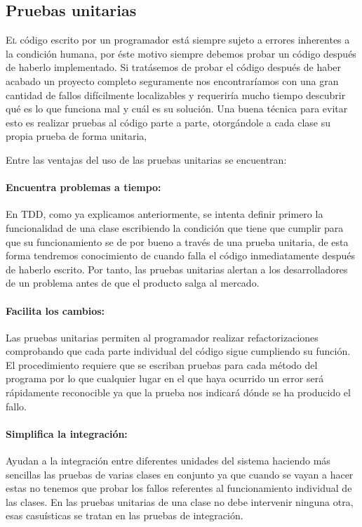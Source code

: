 \documentclass[12pt,a4paper,spanish]{book} %
\begin{document}
\newpage
\subsection{Pruebas unitarias}

\lettrine{E}{l} código escrito por un programador está siempre sujeto a errores inherentes a la condición humana, por éste motivo siempre debemos probar un código después de haberlo implementado. Si tratásemos de probar el código después de haber acabado un proyecto completo seguramente nos encontraríamos con una gran cantidad de fallos difícilmente localizables y requeriría mucho tiempo descubrir qué es lo que funciona mal y cuál es su solución. Una buena técnica para evitar esto es realizar pruebas al código parte a parte, otorgándole a cada clase su propia prueba de forma unitaria,
 
 Entre las ventajas del uso de las pruebas unitarias se encuentran:
 
 \paragraph{Encuentra problemas a tiempo:} En TDD, como ya explicamos anteriormente, se intenta definir primero la funcionalidad de una clase escribiendo la condición que tiene que cumplir para que su funcionamiento se de por bueno a través de una prueba unitaria, de esta forma tendremos conocimiento de cuando falla el código inmediatamente después de haberlo escrito. Por tanto, las pruebas unitarias alertan a los desarrolladores de un problema antes de que el producto salga al mercado.
 \paragraph{Facilita los cambios:} Las pruebas unitarias permiten al programador realizar refactorizaciones comprobando que cada parte individual del código sigue cumpliendo su función. El procedimiento requiere que se escriban pruebas para cada método del programa por lo que cualquier lugar en el que haya ocurrido un error será rápidamente reconocible ya que la prueba nos indicará dónde se ha producido el fallo.
 \paragraph{Simplifica la integración:} Ayudan a la integración entre diferentes unidades del sistema haciendo más sencillas las pruebas de varias clases en conjunto ya que cuando se vayan a hacer estas no tenemos que probar los fallos referentes al funcionamiento individual de las clases. En las pruebas unitarias de una clase no debe intervenir ninguna otra, esas casuísticas se tratan en las pruebas de integración.
\end{document}
